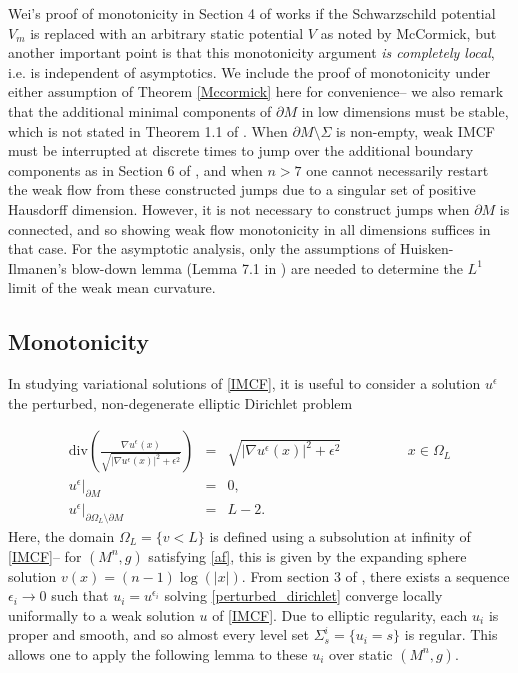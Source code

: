 \documentclass[12pt,twoside]{article}
\theoremstyle{plain}
\theoremstyle{definition}
\theoremstyle{remark}
\numberwithin{equation}{section}
\begin{document}
Wei's proof of monotonicity in Section 4 of \cite{Wei} works if the Schwarzschild potential $V_{m}$ is replaced with an arbitrary static potential $V$ as noted by McCormick, but another important point is that this monotonicity argument \textit{is completely local}, i.e. is independent of asymptotics. We include the proof of monotonicity under either assumption of Theorem \ref{Mccormick} here for convenience-- we also remark that the additional minimal components of $\partial M$ in low dimensions must be stable, which is not stated in Theorem 1.1 of \cite{Mc}. When $\partial M \setminus \Sigma$ is non-empty, weak IMCF must be interrupted at discrete times to jump over the additional boundary components as in Section 6 of \cite{HI}, and when $n>7$ one cannot necessarily restart the weak flow from these constructed jumps due to a singular set of positive Hausdorff dimension. However, it is not necessary to construct jumps when $\partial M$ is connected, and so showing weak flow monotonicity in all dimensions suffices in that case. For the asymptotic analysis, only the assumptions of Huisken-Ilmanen's blow-down lemma (Lemma 7.1 in \cite{HI}) are needed to determine the $L^{1}$ limit of the weak mean curvature.

\subsection{Monotonicity}
In studying variational solutions of \eqref{IMCF}, it is useful to consider a solution $u^{\epsilon}$ the perturbed, non-degenerate elliptic Dirichlet problem

\begin{eqnarray} \label{perturbed_dirichlet}
    \text{div} \left( \frac{\nabla u^{\epsilon}(x)}{\sqrt{|\nabla u^{\epsilon}(x)|^{2} + \epsilon^{2}}} \right) &=& \sqrt{|\nabla u^{\epsilon}(x)|^{2} + \epsilon^{2}} \hspace{2cm} x \in \Omega_{L} \label{u_epsilon} \\
    u^{\epsilon}|_{\partial M} &=& 0, \\ \nonumber
    u^{\epsilon}|_{\partial \Omega_{L} \setminus \partial M} &=& L-2. \nonumber
\end{eqnarray}
Here, the domain $\Omega_{L}= \{ v < L \}$ is defined using a subsolution at infinity of \eqref{IMCF}-- for $(M^{n},g)$ satisfying \eqref{af}, this is given by the expanding sphere solution $v(x)= (n-1) \log(|x|)$. From section 3 of \cite{HI}, there exists a sequence $\epsilon_{i} \rightarrow 0$ such that $u_{i}=u^{\epsilon_{i}}$ solving \eqref{perturbed_dirichlet} converge locally uniformally to a weak solution $u$ of \eqref{IMCF}. Due to elliptic regularity, each $u_{i}$ is proper and smooth, and so almost every level set $\Sigma^{i}_{s}=\{ u_{i} = s \}$ is regular. This allows one to apply the following lemma to these $u_{i}$ over static $(M^{n},g)$.
\end{document}
